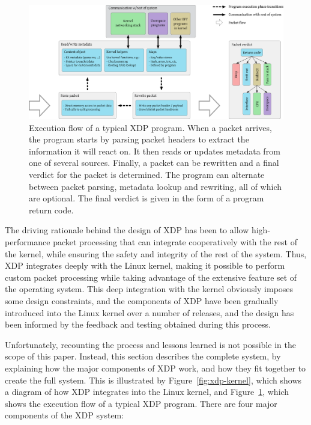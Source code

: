 \documentclass[sigconf]{acmart}
\begin{document}
\begin{figure}[t]
\centering
\includegraphics[width=\linewidth]{figures/xdp-execution-diagram.pdf}
\caption{\label{fig:xdp-execution} Execution flow of a typical XDP program. When
  a packet arrives, the program starts by parsing packet headers to extract the
  information it will react on. It then reads or updates metadata from one of
  several sources. Finally, a packet can be rewritten and a final verdict for
  the packet is determined. The program can alternate between packet parsing,
  metadata lookup and rewriting, all of which are optional. The final verdict is
  given in the form of a program return code.}
\end{figure}



The driving rationale behind the design of XDP has been to allow
high-performance packet processing that can integrate cooperatively with the
rest of the kernel, while ensuring the safety and integrity of the rest of the
system. Thus, XDP integrates deeply with the Linux kernel, making it possible to
perform custom packet processing while taking advantage of the extensive feature
set of the operating system. This deep integration with the kernel obviously
imposes some design constraints, and the components of XDP have been gradually
introduced into the Linux kernel over a number of releases, and the design has
been informed by the feedback and testing obtained during this process.

Unfortunately, recounting the process and lessons learned is not possible in the
scope of this paper. Instead, this section describes the complete system, by
explaining how the major components of XDP work, and how they fit together to
create the full system. This is illustrated by Figure~\ref{fig:xdp-kernel},
which shows a diagram of how XDP integrates into the Linux kernel, and
Figure~\ref{fig:xdp-execution}, which shows the execution flow of a typical XDP
program. There are four major components of the XDP system:
\end{document}
